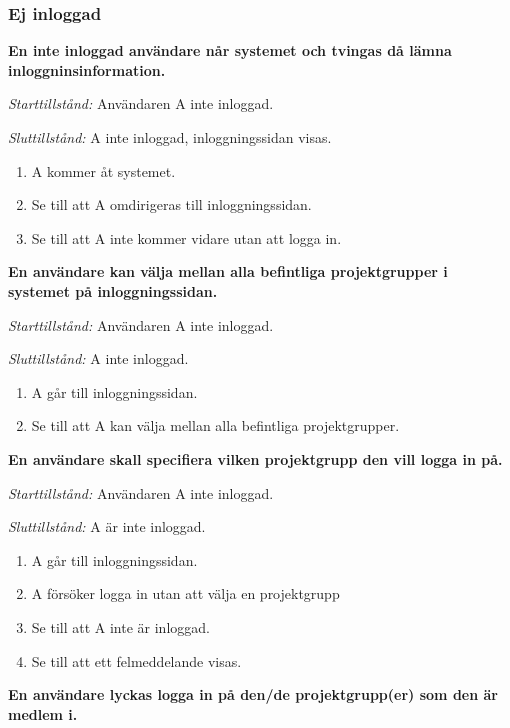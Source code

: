 \documentclass[a4paper]{article}
\begin{document}
\subsubsection{Ej inloggad}
\begin{FT}
\item
\textbf{En inte inloggad användare når systemet och tvingas då lämna inloggninsinformation.}

\emph{Starttillstånd:} Användaren A inte inloggad.

\emph{Sluttillstånd:} A inte inloggad, inloggningssidan visas.

\begin{enumerate}
\item A kommer åt systemet.
\item Se till att A omdirigeras till inloggningssidan.
\item Se till att A inte kommer vidare utan att logga in.
\end{enumerate}

\item
\textbf{En användare kan välja mellan alla befintliga projektgrupper i systemet på inloggningssidan.}

\emph{Starttillstånd:} Användaren A inte inloggad.

\emph{Sluttillstånd:} A inte inloggad.

\begin{enumerate}
\item A går till inloggningssidan.
\item Se till att A kan välja mellan alla befintliga projektgrupper.
\end{enumerate}

\item
\textbf{En användare skall specifiera vilken projektgrupp den vill logga in på.}

\emph{Starttillstånd:} Användaren A inte inloggad.

\emph{Sluttillstånd:} A är inte inloggad.

\begin{enumerate}
\item A går till inloggningssidan.
\item A försöker logga in utan att välja en projektgrupp
\item Se till att A inte är inloggad.
\item Se till att ett felmeddelande visas.
\end{enumerate}

\item
\textbf{En användare lyckas logga in på den/de projektgrupp(er) som den är medlem i.}


\end{FT}
\end{document}

